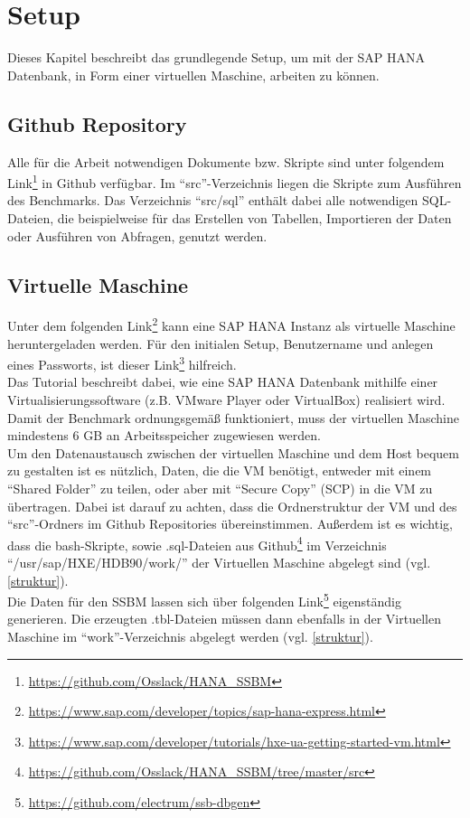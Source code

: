 \chapter{Setup}
Dieses Kapitel beschreibt das grundlegende Setup, um mit der SAP HANA Datenbank, in Form einer virtuellen Maschine, arbeiten zu können.

\section{Github Repository}
Alle für die Arbeit notwendigen Dokumente bzw. Skripte sind unter folgendem Link\footnote{\url{https://github.com/Osslack/HANA_SSBM}} in Github verfügbar. Im \enquote{src}-Verzeichnis liegen die Skripte zum Ausführen des Benchmarks. Das Verzeichnis \enquote{src/sql} enthält dabei alle notwendigen SQL-Dateien, die beispielweise für das Erstellen von Tabellen, Importieren der Daten oder Ausführen von Abfragen, genutzt werden. 


\section{Virtuelle Maschine}
Unter dem folgenden Link\footnote{\url{https://www.sap.com/developer/topics/sap-hana-express.html}}  kann eine SAP HANA Instanz als virtuelle Maschine heruntergeladen werden. Für den initialen Setup, Benutzername und anlegen eines Passworts, ist dieser Link\footnote{\url{https://www.sap.com/developer/tutorials/hxe-ua-getting-started-vm.html}}  hilfreich.\\
Das Tutorial beschreibt dabei, wie eine SAP HANA Datenbank mithilfe einer Virtualisierungssoftware (z.B. VMware Player oder VirtualBox) realisiert wird.\\Damit der Benchmark ordnungsgemäß funktioniert, muss der virtuellen Maschine mindestens 6 GB an Arbeitsspeicher zugewiesen werden. \\Um den Datenaustausch zwischen der virtuellen Maschine und dem Host bequem zu gestalten ist es nützlich, Daten, die die VM benötigt, entweder mit einem \enquote{Shared Folder} zu teilen, oder aber mit \enquote{Secure Copy} (SCP) in die VM zu übertragen. Dabei ist darauf zu achten, dass die Ordnerstruktur der VM und des \enquote{src}-Ordners im Github Repositories  übereinstimmen. Außerdem ist es wichtig, dass die bash-Skripte, sowie .sql-Dateien aus Github\footnote{\url{https://github.com/Osslack/HANA_SSBM/tree/master/src}} im Verzeichnis \enquote{/usr/sap/HXE/HDB90/work/}  der Virtuellen Maschine abgelegt sind (vgl. \autoref{struktur}). \\Die Daten für den SSBM lassen sich über folgenden Link\footnote{\url{https://github.com/electrum/ssb-dbgen}} eigenständig generieren. Die erzeugten .tbl-Dateien müssen dann ebenfalls in der Virtuellen Maschine im \enquote{work}-Verzeichnis abgelegt werden (vgl. \autoref{struktur}).

